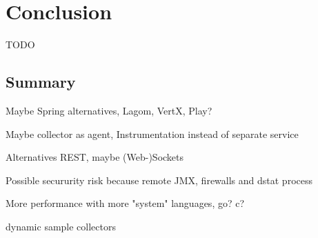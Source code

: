 \chapter{Conclusion}
\label{ch:conclusion}
TODO
\section{Summary}

Maybe Spring alternatives, Lagom, VertX, Play?

Maybe collector as agent, Instrumentation instead of separate service

Alternatives REST, maybe (Web-)Sockets

Possible secururity risk because remote JMX, firewalls and dstat process

More performance with more "system" languages, go? c?

dynamic sample collectors

